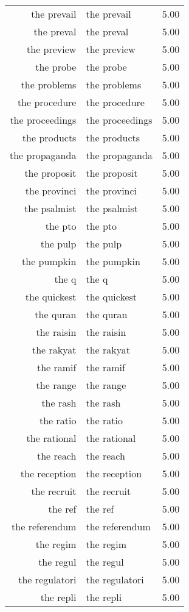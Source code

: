 \begin{table}[ht]
\begin{tabular}{rlr}
  the prevail & the prevail & 5.00 \\ 
  the preval & the preval & 5.00 \\ 
  the preview & the preview & 5.00 \\ 
  the probe & the probe & 5.00 \\ 
  the problems & the problems & 5.00 \\ 
  the procedure & the procedure & 5.00 \\ 
  the proceedings & the proceedings & 5.00 \\ 
  the products & the products & 5.00 \\ 
  the propaganda & the propaganda & 5.00 \\ 
  the proposit & the proposit & 5.00 \\ 
  the provinci & the provinci & 5.00 \\ 
  the psalmist & the psalmist & 5.00 \\ 
  the pto & the pto & 5.00 \\ 
  the pulp & the pulp & 5.00 \\ 
  the pumpkin & the pumpkin & 5.00 \\ 
  the q & the q & 5.00 \\ 
  the quickest & the quickest & 5.00 \\ 
  the quran & the quran & 5.00 \\ 
  the raisin & the raisin & 5.00 \\ 
  the rakyat & the rakyat & 5.00 \\ 
  the ramif & the ramif & 5.00 \\ 
  the range & the range & 5.00 \\ 
  the rash & the rash & 5.00 \\ 
  the ratio & the ratio & 5.00 \\ 
  the rational & the rational & 5.00 \\ 
  the reach & the reach & 5.00 \\ 
  the reception & the reception & 5.00 \\ 
  the recruit & the recruit & 5.00 \\ 
  the ref & the ref & 5.00 \\ 
  the referendum & the referendum & 5.00 \\ 
  the regim & the regim & 5.00 \\ 
  the regul & the regul & 5.00 \\ 
  the regulatori & the regulatori & 5.00 \\ 
  the repli & the repli & 5.00 \\ 

\end{tabular}
\end{table}
